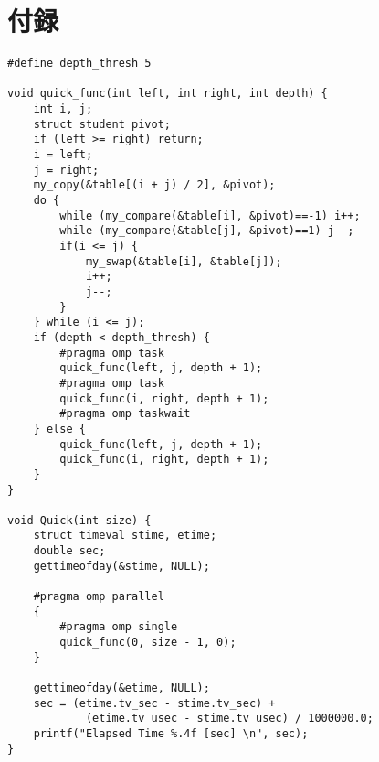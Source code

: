 \section{付録}
\begin{lstlisting}[caption=Quick sort,label=fuga]
#define depth_thresh 5

void quick_func(int left, int right, int depth) {
	int i, j;
	struct student pivot;
	if (left >= right) return;
	i = left;
	j = right;
	my_copy(&table[(i + j) / 2], &pivot);
	do {
		while (my_compare(&table[i], &pivot)==-1) i++;
		while (my_compare(&table[j], &pivot)==1) j--;
		if(i <= j) {
			my_swap(&table[i], &table[j]);
			i++;
			j--;
		}
	} while (i <= j);
	if (depth < depth_thresh) {
		#pragma omp task
		quick_func(left, j, depth + 1);
		#pragma omp task
		quick_func(i, right, depth + 1);
		#pragma omp taskwait
	} else {
		quick_func(left, j, depth + 1);
		quick_func(i, right, depth + 1);
	}
}

void Quick(int size) {
	struct timeval stime, etime;
	double sec;
	gettimeofday(&stime, NULL);

	#pragma omp parallel
	{
		#pragma omp single
		quick_func(0, size - 1, 0);
	}

	gettimeofday(&etime, NULL);
	sec = (etime.tv_sec - stime.tv_sec) + 
			(etime.tv_usec - stime.tv_usec) / 1000000.0;
	printf("Elapsed Time %.4f [sec] \n", sec);
}
\end{lstlisting}
\clearpage
